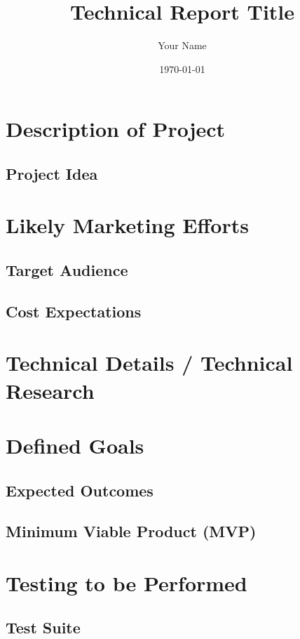 \documentclass{report}
\title{Technical Report Title}
\author{Your Name}
\date{\today}
\begin{document}
\maketitle

\tableofcontents
\newpage

\chapter{Description of Project}
\section{Project Idea}
\lipsum[1-2]

\chapter{Likely Marketing Efforts}
\section{Target Audience}
\lipsum[3]
\section{Cost Expectations}
\lipsum[4]

\chapter{Technical Details / Technical Research}
\lipsum[5-6]

\chapter{Defined Goals}
\section{Expected Outcomes}
\lipsum[7]
\section{Minimum Viable Product (MVP)}
\lipsum[8]

\chapter{Testing to be Performed}
\section{Test Suite}
\lipsum[9]
\end{document}
